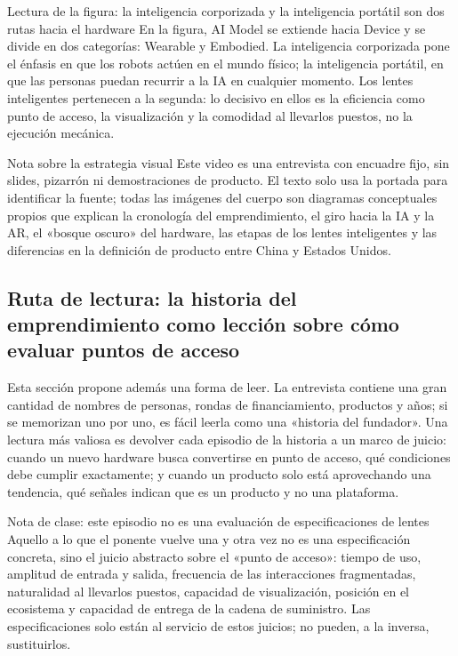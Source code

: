 \begin{knowledgebox}{Lectura de la figura: la inteligencia corporizada y la inteligencia portátil son dos rutas hacia el hardware}
En la figura, AI Model se extiende hacia Device y se divide en dos categorías: Wearable y Embodied. La inteligencia corporizada pone el énfasis en que los robots actúen en el mundo físico; la inteligencia portátil, en que las personas puedan recurrir a la IA en cualquier momento. Los lentes inteligentes pertenecen a la segunda: lo decisivo en ellos es la eficiencia como punto de acceso, la visualización y la comodidad al llevarlos puestos, no la ejecución mecánica.
\end{knowledgebox}

\begin{knowledgebox}{Nota sobre la estrategia visual}
Este video es una entrevista con encuadre fijo, sin slides, pizarrón ni demostraciones de producto. El texto solo usa la portada para identificar la fuente; todas las imágenes del cuerpo son diagramas conceptuales propios que explican la cronología del emprendimiento, el giro hacia la IA y la AR, el «bosque oscuro» del hardware, las etapas de los lentes inteligentes y las diferencias en la definición de producto entre China y Estados Unidos.
\end{knowledgebox}

\subsection{Ruta de lectura: la historia del emprendimiento como lección sobre cómo evaluar puntos de acceso}

Esta sección propone además una forma de leer. La entrevista contiene una gran cantidad de nombres de personas, rondas de financiamiento, productos y años; si se memorizan uno por uno, es fácil leerla como una «historia del fundador». Una lectura más valiosa es devolver cada episodio de la historia a un marco de juicio: cuando un nuevo hardware busca convertirse en punto de acceso, qué condiciones debe cumplir exactamente; y cuando un producto solo está aprovechando una tendencia, qué señales indican que es un producto y no una plataforma.

\begin{knowledgebox}{Nota de clase: este episodio no es una evaluación de especificaciones de lentes}
Aquello a lo que el ponente vuelve una y otra vez no es una especificación concreta, sino el juicio abstracto sobre el «punto de acceso»: tiempo de uso, amplitud de entrada y salida, frecuencia de las interacciones fragmentadas, naturalidad al llevarlos puestos, capacidad de visualización, posición en el ecosistema y capacidad de entrega de la cadena de suministro. Las especificaciones solo están al servicio de estos juicios; no pueden, a la inversa, sustituirlos.
\end{knowledgebox}

